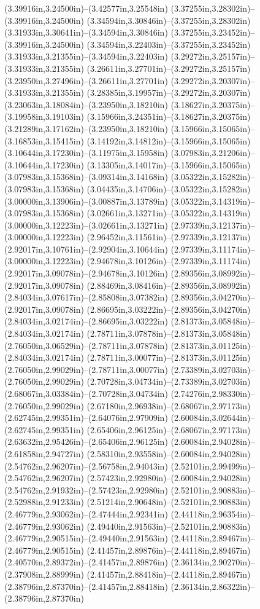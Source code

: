(3.39916in,3.24500in)--(3.42577in,3.25548in) (3.37255in,3.28302in)--(3.39916in,3.24500in) (3.34594in,3.30846in)--(3.37255in,3.28302in) (3.31933in,3.30641in)--(3.34594in,3.30846in) (3.37255in,3.23452in)--(3.39916in,3.24500in) (3.34594in,3.22403in)--(3.37255in,3.23452in) (3.31933in,3.21355in)--(3.34594in,3.22403in) (3.29272in,3.25157in)--(3.31933in,3.21355in) (3.26611in,3.27701in)--(3.29272in,3.25157in) (3.23950in,3.27496in)--(3.26611in,3.27701in) (3.29272in,3.20307in)--(3.31933in,3.21355in) (3.28385in,3.19957in)--(3.29272in,3.20307in) (3.23063in,3.18084in)--(3.23950in,3.18210in) (3.18627in,3.20375in)--(3.19958in,3.19103in) (3.15966in,3.24351in)--(3.18627in,3.20375in) (3.21289in,3.17162in)--(3.23950in,3.18210in) (3.15966in,3.15065in)--(3.16853in,3.15415in) (3.14192in,3.14812in)--(3.15966in,3.15065in) (3.10644in,3.17230in)--(3.11975in,3.15958in) (3.07983in,3.21206in)--(3.10644in,3.17230in) (3.13305in,3.14017in)--(3.15966in,3.15065in) (3.07983in,3.15368in)--(3.09314in,3.14168in) (3.05322in,3.15282in)--(3.07983in,3.15368in) (3.04435in,3.14706in)--(3.05322in,3.15282in) (3.00000in,3.13906in)--(3.00887in,3.13789in) (3.05322in,3.14319in)--(3.07983in,3.15368in) (3.02661in,3.13271in)--(3.05322in,3.14319in) (3.00000in,3.12223in)--(3.02661in,3.13271in) (2.97339in,3.12137in)--(3.00000in,3.12223in) (2.96452in,3.11561in)--(2.97339in,3.12137in) (2.92017in,3.10761in)--(2.92904in,3.10644in) (2.97339in,3.11174in)--(3.00000in,3.12223in) (2.94678in,3.10126in)--(2.97339in,3.11174in) (2.92017in,3.09078in)--(2.94678in,3.10126in) (2.89356in,3.08992in)--(2.92017in,3.09078in) (2.88469in,3.08416in)--(2.89356in,3.08992in) (2.84034in,3.07617in)--(2.85808in,3.07382in) (2.89356in,3.04270in)--(2.92017in,3.09078in) (2.86695in,3.03222in)--(2.89356in,3.04270in) (2.84034in,3.02174in)--(2.86695in,3.03222in) (2.81373in,3.05848in)--(2.84034in,3.02174in) (2.78711in,3.07878in)--(2.81373in,3.05848in) (2.76050in,3.06529in)--(2.78711in,3.07878in) (2.81373in,3.01125in)--(2.84034in,3.02174in) (2.78711in,3.00077in)--(2.81373in,3.01125in) (2.76050in,2.99029in)--(2.78711in,3.00077in) (2.73389in,3.02703in)--(2.76050in,2.99029in) (2.70728in,3.04734in)--(2.73389in,3.02703in) (2.68067in,3.03384in)--(2.70728in,3.04734in) (2.74276in,2.98330in)--(2.76050in,2.99029in) (2.67180in,2.96938in)--(2.68067in,2.97173in) (2.62745in,2.99351in)--(2.64076in,2.97909in) (2.60084in,3.02644in)--(2.62745in,2.99351in) (2.65406in,2.96125in)--(2.68067in,2.97173in) (2.63632in,2.95426in)--(2.65406in,2.96125in) (2.60084in,2.94028in)--(2.61858in,2.94727in) (2.58310in,2.93558in)--(2.60084in,2.94028in) (2.54762in,2.96207in)--(2.56758in,2.94043in) (2.52101in,2.99499in)--(2.54762in,2.96207in) (2.57423in,2.92980in)--(2.60084in,2.94028in) (2.54762in,2.91932in)--(2.57423in,2.92980in) (2.52101in,2.90883in)--(2.52988in,2.91233in) (2.51214in,2.90648in)--(2.52101in,2.90883in) (2.46779in,2.93062in)--(2.47444in,2.92341in) (2.44118in,2.96354in)--(2.46779in,2.93062in) (2.49440in,2.91563in)--(2.52101in,2.90883in) (2.46779in,2.90515in)--(2.49440in,2.91563in) (2.44118in,2.89467in)--(2.46779in,2.90515in) (2.41457in,2.89876in)--(2.44118in,2.89467in) (2.40570in,2.89372in)--(2.41457in,2.89876in) (2.36134in,2.90270in)--(2.37908in,2.88999in) (2.41457in,2.88418in)--(2.44118in,2.89467in) (2.38796in,2.87370in)--(2.41457in,2.88418in) (2.36134in,2.86322in)--(2.38796in,2.87370in) 